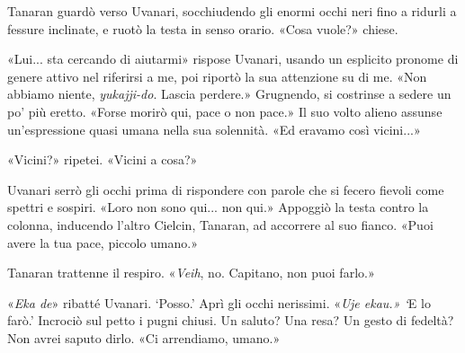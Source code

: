 Tanaran guardò verso Uvanari, socchiudendo gli enormi occhi neri fino a
ridurli a fessure inclinate, e ruotò la testa in senso orario. «Cosa
vuole?» chiese.

«Lui... sta cercando di aiutarmi» rispose Uvanari, usando un esplicito
pronome di genere attivo nel riferirsi a me, poi riportò la sua
attenzione su di me. «Non abbiamo niente, \emph{yukajji-do}. Lascia
perdere.» Grugnendo, si costrinse a sedere un po' più eretto. «Forse
morirò qui, pace o non pace.» Il suo volto alieno assunse un'espressione
quasi umana nella sua solennità. «Ed eravamo così vicini...»

«Vicini?» ripetei. «Vicini a cosa?»

Uvanari serrò gli occhi prima di rispondere con parole che si fecero
fievoli come spettri e sospiri. «Loro non sono qui... non qui.» Appoggiò
la testa contro la colonna, inducendo l'altro Cielcin, Tanaran, ad
accorrere al suo fianco. «Puoi avere la tua pace, piccolo umano.»

Tanaran trattenne il respiro. «\emph{Veih}, no. Capitano, non puoi
farlo.»

«\emph{Eka de}» ribatté Uvanari. `Posso.' Aprì gli occhi nerissimi.
«\emph{Uje ekau.» `}E lo farò.' Incrociò sul petto i pugni chiusi. Un
saluto? Una resa? Un gesto di fedeltà? Non avrei saputo dirlo. «Ci
arrendiamo, umano.»

